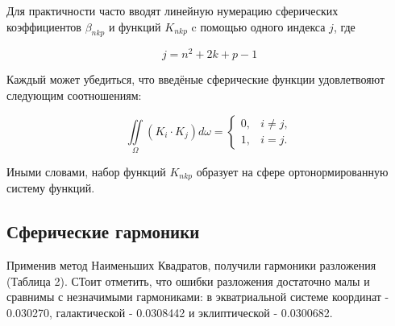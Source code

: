 \documentclass[14pt]{article} %
\begin{document}
Для практичности часто вводят линейную нумерацию  сферических коэффициентов $\beta_{nkp}$ и функций $K_{nkp}$ c помощью одного индекса $j$, где

\begin{equation}\label{f:sf_j}
j = n^2 + 2k + p -1
\end{equation}

Каждый может убедиться, что введёные сферические функции удовлетвояют следующим соотношениям:

\begin{equation}
\iint\limits_\Omega \left(K_i \cdot K_j \right) d\omega =  \left\{ \begin{array}{cc}
0, & i \neq j,\\
1, & i = j.
\end{array} \right.
\end{equation}

Иными словами, набор функций $K_{nkp}$ образует на сфере ортонормированную систему функций.







\subsection{Сферические гармоники}\label{sistem}  
Применив метод Наименьших Квадратов, получили гармоники разложения (Таблица 2). СТоит отметить, что ошибки разложения достаточно малы и сравнимы с незначимыми гармониками: в экватриальной системе координат - 0.030270, галактической - 0.0308442 и эклиптической - 0.0300682.
\end{document}
